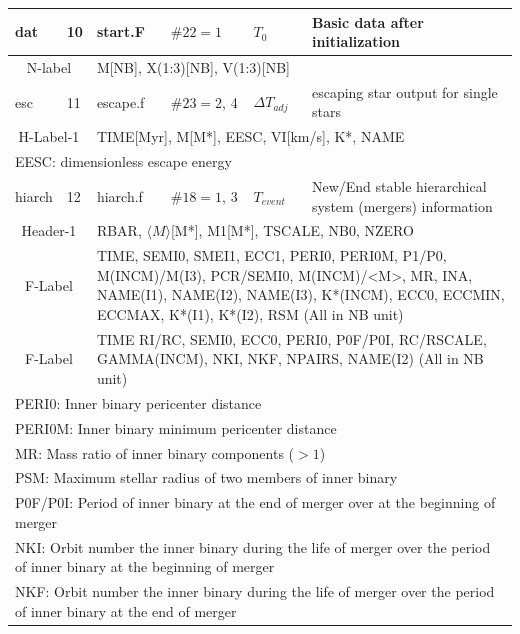 \begin{longtable}{||p{0.42in}|p{0.25in}|p{0.6in}|p{0.6in}|p{0.4in}|p{2.3in}||}
    dat    & 10  & start.F    & $\#22=1$   & $T_0$      & Basic data after initialization \\\hline
\multicolumn{2}{|c|}{ N-label } &  \multicolumn{4}{|p{4.4in}|}{ M[NB], X(1:3)[NB], V(1:3)[NB] }\\\hline\hline

    esc    & 11  & escape.f   & $\#23=2$, 4 & $\Delta T_{adj}$      & escaping star output for single stars           \\\hline
\multicolumn{2}{|c|}{ H-Label-1 } & \multicolumn{4}{|p{4.4in}|}{ TIME[Myr], M[M*], EESC, VI[km/s], K*, NAME} \\\hline
\multicolumn{6}{|p{5.4in}|}{ EESC: dimensionless escape energy }\\\hline\hline

   hiarch  & 12  & hiarch.f   & $\#18=1$, 3 & $T_{event}$  & New/End stable hierarchical system (mergers) information \\\hline
\multicolumn{2}{|c|}{ Header-1 } & \multicolumn{4}{|p{4.4in}|}{ RBAR, $\langle M\rangle$[M*], M1[M*], TSCALE, NB0, NZERO }\\\hline
\multicolumn{2}{|c|}{ F-Label} & \multicolumn{4}{|p{4.4in}|}{ TIME, SEMI0, SMEI1, ECC1, PERI0, PERI0M, P1/P0, M(INCM)/M(I3), PCR/SEMI0, M(INCM)/<M>, MR, INA, NAME(I1), NAME(I2), NAME(I3), K*(INCM), ECC0, ECCMIN, ECCMAX, K*(I1), K*(I2), RSM (All in NB unit)}\\
\multicolumn{2}{|c|}{ F-Label} & \multicolumn{4}{|p{4.4in}|}{ TIME RI/RC, SEMI0, ECC0, PERI0, P0F/P0I, RC/RSCALE, GAMMA(INCM), NKI, NKF, NPAIRS, NAME(I2) (All in NB unit)}\\ \hline
\multicolumn{6}{|p{5.4in}|}{PERI0: Inner binary pericenter distance }\\
\multicolumn{6}{|p{5.4in}|}{PERI0M: Inner binary minimum pericenter distance }\\
\multicolumn{6}{|p{5.4in}|}{MR: Mass ratio of inner binary components ($>1$) }\\
\multicolumn{6}{|p{5.4in}|}{PSM: Maximum stellar radius of two members of inner binary} \\
\multicolumn{6}{|p{5.4in}|}{P0F/P0I: Period of inner binary at the end of merger over at the beginning of merger} \\
\multicolumn{6}{|p{5.4in}|}{NKI: Orbit number the inner binary during the life of merger over the period of inner binary at the beginning of merger}\\
\multicolumn{6}{|p{5.4in}|}{NKF: Orbit number the inner binary during the life of merger over the period of inner binary at the end of merger}\\
\hline\hline


\end{longtable}
